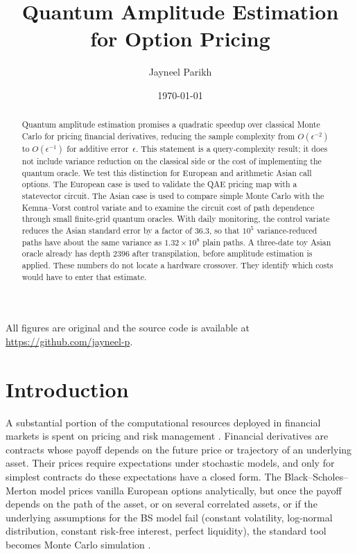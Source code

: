 \documentclass[12pt]{article}
\title{\textbf{Quantum Amplitude Estimation for Option Pricing}}
\author{Jayneel Parikh}
\date{\today}
\begin{document}
\maketitle

\begin{abstract}
Quantum amplitude estimation promises a quadratic speedup over classical Monte Carlo for pricing financial derivatives, reducing the sample complexity from $O(\epsilon^{-2})$ to $O(\epsilon^{-1})$ for additive error~$\epsilon$.  This statement is a query-complexity result; it does not include variance reduction on the classical side or the cost of implementing the quantum oracle.  We test this distinction for European and arithmetic Asian call options.  The European case is used to validate the QAE pricing map with a statevector circuit.  The Asian case is used to compare simple Monte Carlo with the Kemna--Vorst control variate and to examine the circuit cost of path dependence through small finite-grid quantum oracles.  With daily monitoring, the control variate reduces the Asian standard error by a factor of $36.3$, so that $10^5$ variance-reduced paths have about the same variance as $1.32\times10^8$ plain paths.  A three-date toy Asian oracle already has depth $2396$ after transpilation, before amplitude estimation is applied.  These numbers do not locate a hardware crossover.  They identify which costs would have to enter that estimate.
\end{abstract}

 All figures are original and the source code is available at \url{https://github.com/jayneel-p}.


\section{Introduction}

A substantial portion of the computational resources deployed in financial markets is spent on pricing and risk management \cite{rebentrostQuantumComputationalFinance2018}.  Financial derivatives are contracts whose payoff depends on the future price or trajectory of an underlying asset.  Their prices require expectations under stochastic models, and only for simplest contracts do these expectations have a closed form.  The Black--Scholes--Merton model \cite{blackPricingOptionsCorporate1973,mertonTheoryRationalOption1973} prices vanilla European options analytically, but once the payoff depends on the path of the asset, or on several correlated assets, or if the underlying assumptions for the BS model fail (constant volatility, log-normal distribution, constant risk-free interest, perfect liquidity), the standard tool becomes Monte Carlo simulation \cite{glassermanMonteCarloMethods2004}.
\end{document}
